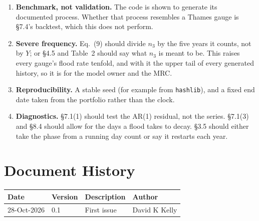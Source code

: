 \documentclass[11pt,a4paper]{article}
\renewcommand{\mkmhistorypage}[1]{%
    \section{Document History}
    \begin{table}[ht]
        \centering
        \begin{tabular}{l|l|p{9cm}|l}
            \textbf{Date} & \textbf{Version} & \textbf{Description} & \textbf{Author} \\
            \hline
            #1
        \end{tabular}
    \end{table}
}
\begin{document}
\begin{enumerate}[leftmargin=*]
\item \textbf{Benchmark, not validation.} The code is shown to generate its documented
  process. Whether that process resembles a Thames gauge is \S7.4's backtest, which
  this does not perform.
\item \textbf{Severe frequency.} Eq.~(9) should divide $n_3$ by the five years it
  counts, not by $Y$; or \S4.5 and Table~2 should say what $n_3$ is meant to be. This
  raises every gauge's flood rate tenfold, and with it the upper tail of every
  generated history, so it is for the model owner and the MRC.
\item \textbf{Reproducibility.} A stable seed (for example from \texttt{hashlib}), and
  a fixed end date taken from the portfolio rather than the clock.
\item \textbf{Diagnostics.} \S7.1(1) should test the AR(1) residual, not the series.
  \S7.1(3) and \S8.4 should allow for the days a flood takes to decay. \S3.5 should
  either take the phase from a running day count or say it restarts each year.
\end{enumerate}

\mkmhistorypage{28-Oct-2026 & 0.1 & First issue & David K Kelly \\}
\end{document}

